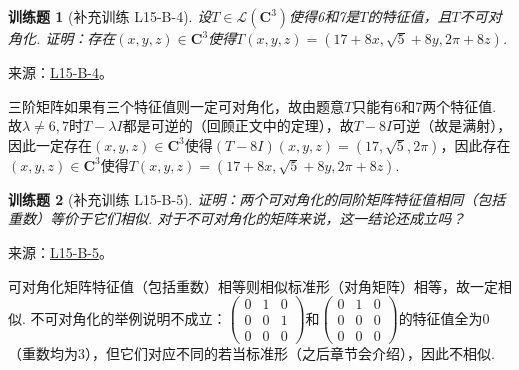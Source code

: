 \documentclass[UTF8,12pt,a4paper,fontset=fandol]{ctexart}
\newtheorem{exercise}{训练题}[section]
\begin{document}
\begin{exercise}[补充训练 L15-B-4]\label{prob:L15-B-4}
设$T\in \mathcal{L}(\mathbf{C}^3)$使得6和7是$T$的特征值，且$T$不可对角化. 证明：存在$(x,y,z)\in\mathbf{C}^3$使得$T(x,y,z)=(17+8x,\sqrt{5}+8y,2\pi+8z)$.
\end{exercise}
\noindent 来源：\href{https://github.com/yhwu-is/Linear-Algebra-Left-Undone/blob/new/%E8%AE%B2%E4%B9%89/%E4%B8%93%E9%A2%98/15%20%E7%9B%B8%E4%BC%BC%E6%A0%87%E5%87%86%E5%BD%A2%EF%BC%9A%E5%A4%8D%E6%95%B0%E5%9F%9F%E4%B8%8A%E7%9A%84%E5%B0%9D%E8%AF%95%E4%B8%8E%E7%90%86%E8%AE%BA.tex}{L15-B-4}。
\begin{solve}
三阶矩阵如果有三个特征值则一定可对角化，故由题意$T$只能有6和7两个特征值. 故$\lambda\neq 6,7$时$T-\lambda I$都是可逆的（回顾正文中的定理），故$T-8I$可逆（故是满射），因此一定存在$(x,y,z)\in\mathbf{C}^3$使得$(T-8I)(x,y,z)=(17,\sqrt{5},2\pi)$，因此存在$(x,y,z)\in\mathbf{C}^3$使得$T(x,y,z)=(17+8x,\sqrt{5}+8y,2\pi+8z)$.
\end{solve}

\begin{exercise}[补充训练 L15-B-5]\label{prob:L15-B-5}
证明：两个可对角化的同阶矩阵特征值相同（包括重数）等价于它们相似. 对于不可对角化的矩阵来说，这一结论还成立吗？
\end{exercise}
\noindent 来源：\href{https://github.com/yhwu-is/Linear-Algebra-Left-Undone/blob/new/%E8%AE%B2%E4%B9%89/%E4%B8%93%E9%A2%98/15%20%E7%9B%B8%E4%BC%BC%E6%A0%87%E5%87%86%E5%BD%A2%EF%BC%9A%E5%A4%8D%E6%95%B0%E5%9F%9F%E4%B8%8A%E7%9A%84%E5%B0%9D%E8%AF%95%E4%B8%8E%E7%90%86%E8%AE%BA.tex}{L15-B-5}。
\begin{solve}
可对角化矩阵特征值（包括重数）相等则相似标准形（对角矩阵）相等，故一定相似. 不可对角化的举例说明不成立：$\begin{pmatrix}
                0 & 1 & 0 \\ 0 & 0 & 1 \\ 0 & 0 & 0
            \end{pmatrix}$和$\begin{pmatrix}
                0 & 1 & 0 \\ 0 & 0 & 0 \\ 0 & 0 & 0
            \end{pmatrix}$的特征值全为0（重数均为3），但它们对应不同的若当标准形（之后章节会介绍），因此不相似.
\end{solve}
\end{document}
